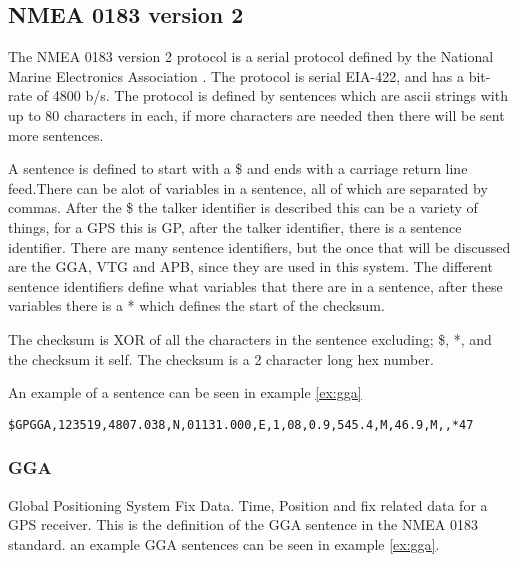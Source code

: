 \subsection{NMEA 0183 version 2}
The NMEA 0183 version 2 protocol is a serial protocol defined by the National Marine Electronics Association \cite{NMEA}. 
The protocol is serial EIA-422, and has a bit-rate of 4800 b/s. The protocol is defined by sentences which are ascii strings with up to 80 characters in each, if more characters are needed then there will be sent more sentences. 

A sentence is defined to start with a \$ and ends with a carriage return line feed.There can be alot of variables in a sentence, all of which are separated by commas. After the \$ the talker identifier is described this can be a variety of things, for a GPS this is GP, after the talker identifier, there is a sentence identifier. There are many sentence identifiers, but the once that will be discussed are the GGA, VTG and APB, since they are used in this system. The different sentence identifiers define what variables that there are in a sentence, after these variables there is a * which defines the start of the checksum.

The checksum is XOR of all the characters in the sentence excluding; \$, *, and the checksum it self. The checksum is a 2 character long hex number.

An example of a sentence can be seen in example \ref{ex:gga}
\begin{ex}
\texttt{\$GPGGA,123519,4807.038,N,01131.000,E,1,08,0.9,545.4,M,46.9,M,,*47}
\label{ex:gga}
\end{ex}

\subsubsection{GGA}
Global Positioning System Fix Data. Time, Position and fix related data for a GPS receiver. This is the definition of the GGA sentence in the NMEA 0183 standard. an example GGA sentences can be seen in example \ref{ex:gga}.

